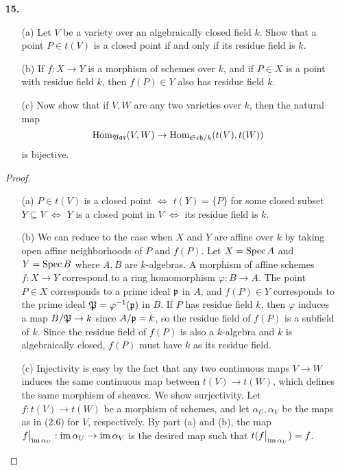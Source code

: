 \documentclass{article}
\begin{document}
\begin{enumerate} [label=\textbf{\arabic*.}, leftmargin=0em]
\item[\textbf{15.}] \begin{itemize}
    \item[(a)] Let $V$ be a variety over an algebraically closed field $k$. Show that a point $P \in t(V)$ is a closed point if and only if its residue field is $k$.
    \item[(b)] If $f : X \to Y$ is a morphism of schemes over $k$, and if $P \in X$ is a point with residue field $k$, then $f(P) \in Y$ also has residue field $k$.
    \item[(c)] Now show that if $V, W$ are any two varieties over $k$, then the natural map
    \begin{equation*}
        \operatorname{Hom}_{\mathfrak{Var}}(V, W) \to \operatorname{Hom}_{\mathfrak{Sch}/k}(t(V), t(W))
    \end{equation*}
    is bijective.
\end{itemize}

\begin{proof} $ $ \vspace{0pt}
    \begin{itemize} [leftmargin=0cm]
        \item[(a)] $P \in t(V)$ is a closed point $\iff$ $t(Y) = \{ P \}$ for some closed subset $Y \subseteq V$ $\iff$ $Y$ is a closed point in $V$ $\iff$ its residue field is $k$.

        \item[(b)] We can reduce to the case when $X$ and $Y$ are affine over $k$ by taking open affine neighborhoods of $P$ and $f(P)$. Let $X = \operatorname{Spec}{A}$ and $Y = \operatorname{Spec}{B}$ where $A, B$ are $k$-algebras. A morphism of affine schemes $f : X \to Y$ correspond to a ring homomorphism $\varphi : B \to A$. The point $P \in X$ corresponds to a prime ideal $\mathfrak{p}$ in $A$, and $f(P) \in Y$ corresponds to the prime ideal $\mathfrak{P} = \varphi^{-1}(\mathfrak{p})$ in $B$. If $P$ has residue field $k$, then $\varphi$ induces a map $B / \mathfrak{P} \to  k$ since $A / \mathfrak{p} = k$, so the residue field of $f(P)$ is a subfield of $k$. Since the residue field of $f(P)$ is also a $k$-algebra and $k$ is algebraically closed, $f(P)$ must have $k$ as its residue field.

        \item[(c)] Injectivity is easy by the fact that any two continuous maps $V \to W$ induces the same continuous map between $t(V) \to t(W)$, which defines the same morphism of sheaves. We show surjectivity. Let $f : t(V) \to t(W)$ be a morphism of schemes, and let $\alpha_{U}, \alpha_V$ be the maps as in (2.6) for $V$, respectively. By part (a) and (b), the map $\restr{f}{\im{\alpha_U}} : \im{\alpha_U} \to \im{\alpha_V}$ is the desired map such that $t(\restr{f}{\im{\alpha_U}}) = f$.
    \end{itemize}
\end{proof}


\end{enumerate}
\end{document}
